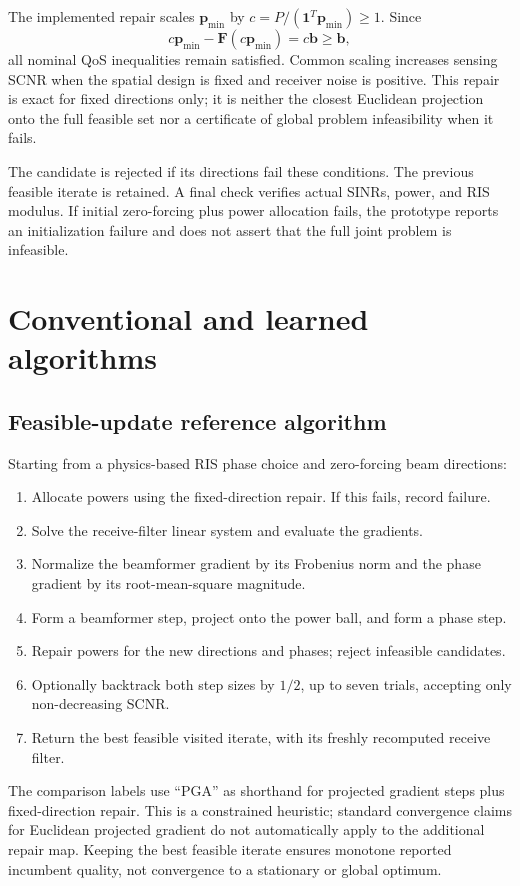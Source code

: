 \documentclass[11pt,a4paper]{article}
\begin{document}
The implemented repair scales $\mathbf p_{\min}$ by $c=P/(\mathbf1^T\mathbf p_{\min})\geq1$. Since
\begin{equation}
 c\mathbf p_{\min}-\mathbf F(c\mathbf p_{\min})=c\mathbf b\geq\mathbf b,
\end{equation}
all nominal QoS inequalities remain satisfied. Common scaling increases sensing SCNR when the spatial design is fixed and receiver noise is positive. This repair is exact for fixed directions only; it is neither the closest Euclidean projection onto the full feasible set nor a certificate of global problem infeasibility when it fails.

The candidate is rejected if its directions fail these conditions. The previous feasible iterate is retained. A final check verifies actual SINRs, power, and RIS modulus. If initial zero-forcing plus power allocation fails, the prototype reports an initialization failure and does not assert that the full joint problem is infeasible.

\section{Conventional and learned algorithms}
\subsection{Feasible-update reference algorithm}
Starting from a physics-based RIS phase choice and zero-forcing beam directions:
\begin{enumerate}
\item Allocate powers using the fixed-direction repair. If this fails, record failure.
\item Solve the receive-filter linear system and evaluate the gradients.
\item Normalize the beamformer gradient by its Frobenius norm and the phase gradient by its root-mean-square magnitude.
\item Form a beamformer step, project onto the power ball, and form a phase step.
\item Repair powers for the new directions and phases; reject infeasible candidates.
\item Optionally backtrack both step sizes by $1/2$, up to seven trials, accepting only non-decreasing SCNR.
\item Return the best feasible visited iterate, with its freshly recomputed receive filter.
\end{enumerate}
The comparison labels use ``PGA'' as shorthand for projected gradient steps plus fixed-direction repair. This is a constrained heuristic; standard convergence claims for Euclidean projected gradient do not automatically apply to the additional repair map. Keeping the best feasible iterate ensures monotone reported incumbent quality, not convergence to a stationary or global optimum.
\end{document}
